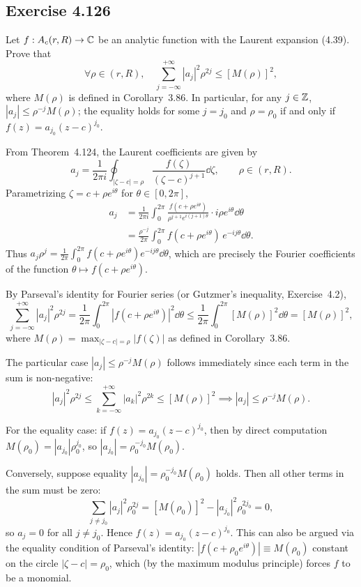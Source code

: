 \documentclass{article}
\begin{document}
\subsection{Exercise 4.126}

Let $f : A_c(r, R) \to \mathbb{C}$ be an analytic function with the Laurent
expansion (4.39). Prove that
\[
  \forall \rho \in (r, R), \quad
  \sum_{j=-\infty}^{+\infty} |a_j|^2 \rho^{2j} \le [M(\rho)]^2,
\]
where $M(\rho)$ is defined in Corollary~3.86. In particular, for any
$j \in \mathbb{Z}$, $|a_j| \le \rho^{-j} M(\rho)$; the equality holds for some
$j = j_0$ and $\rho = \rho_0$ if and only if $f(z) = a_{j_0}(z-c)^{j_0}$.

\begin{solution}
  From Theorem~4.124, the Laurent coefficients are given by
  \[
    a_j = \frac{1}{2\pi i} \oint_{|\zeta-c|=\rho}
    \frac{f(\zeta)}{(\zeta-c)^{j+1}} \dd\zeta, \qquad \rho \in (r, R).
  \]
  Parametrizing $\zeta = c + \rho e^{i\theta}$ for $\theta \in [0, 2\pi]$,
  \begin{align*}
    a_j &= \frac{1}{2\pi i} \int_{0}^{2\pi}
    \frac{f(c + \rho e^{i\theta})}{\rho^{j+1} e^{i(j+1)\theta}}
    \cdot i\rho e^{i\theta} \dd\theta\\
    &= \frac{\rho^{-j}}{2\pi} \int_{0}^{2\pi}
    f(c + \rho e^{i\theta}) \, e^{-ij\theta} \dd\theta.
  \end{align*}
  Thus $a_j \rho^j = \frac{1}{2\pi} \int_0^{2\pi} f(c + \rho e^{i\theta})
  e^{-ij\theta} \dd\theta$, which are precisely the Fourier coefficients of
  the function $\theta \mapsto f(c + \rho e^{i\theta})$.

  By Parseval's identity for Fourier series (or Gutzmer's inequality,
  Exercise~4.2),
  \[
    \sum_{j=-\infty}^{+\infty} |a_j|^2 \rho^{2j}
    = \frac{1}{2\pi} \int_{0}^{2\pi} |f(c + \rho e^{i\theta})|^2 \dd\theta
    \le \frac{1}{2\pi} \int_{0}^{2\pi} [M(\rho)]^2 \dd\theta
    = [M(\rho)]^2,
  \]
  where $M(\rho) = \max_{|\zeta-c|=\rho} |f(\zeta)|$ as defined in
  Corollary~3.86.

  The particular case $|a_j| \le \rho^{-j} M(\rho)$ follows immediately since
  each term in the sum is non-negative:
  \[
    |a_j|^2 \rho^{2j} \le \sum_{k=-\infty}^{+\infty} |a_k|^2 \rho^{2k}
    \le [M(\rho)]^2 \implies |a_j| \le \rho^{-j} M(\rho).
  \]

  For the equality case: if $f(z) = a_{j_0}(z-c)^{j_0}$, then by direct
  computation $M(\rho_0) = |a_{j_0}| \rho_0^{j_0}$, so
  $|a_{j_0}| = \rho_0^{-j_0} M(\rho_0)$.

  Conversely, suppose equality $|a_{j_0}| = \rho_0^{-j_0} M(\rho_0)$ holds.
  Then all other terms in the sum must be zero:
  \[
    \sum_{j \ne j_0} |a_j|^2 \rho_0^{2j}
    = [M(\rho_0)]^2 - |a_{j_0}|^2 \rho_0^{2j_0} = 0,
  \]
  so $a_j = 0$ for all $j \ne j_0$. Hence $f(z) = a_{j_0}(z-c)^{j_0}$.
  This can also be argued via the equality condition of Parseval's identity:
  $|f(c + \rho_0 e^{i\theta})| \equiv M(\rho_0)$ constant on the circle
  $|\zeta-c| = \rho_0$, which (by the maximum modulus principle) forces
  $f$ to be a monomial.
\end{solution}
\end{document}

